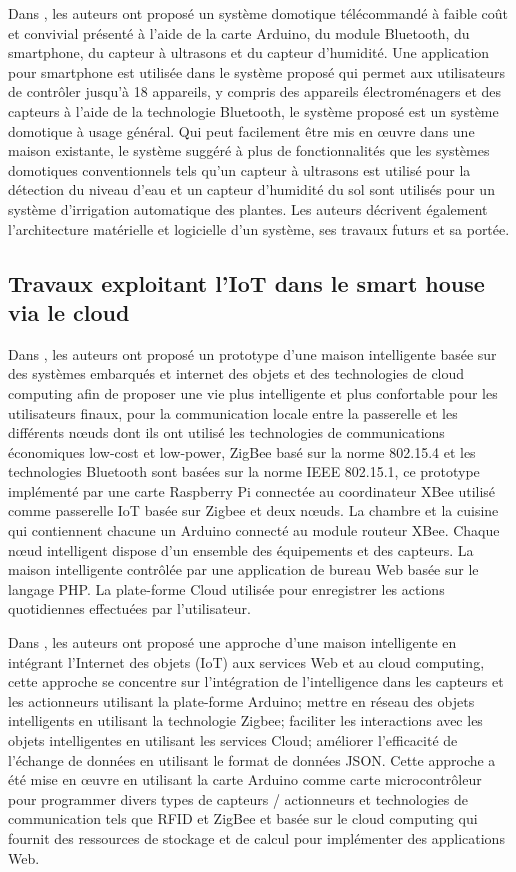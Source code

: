 Dans \cite{chap38}, les auteurs ont proposé un système domotique télécommandé à faible coût et convivial présenté à l'aide de la carte Arduino, du module Bluetooth, du smartphone, du capteur à ultrasons et du capteur d'humidité. Une application pour smartphone est utilisée dans le système proposé qui permet aux utilisateurs de contrôler jusqu'à 18 appareils, y compris des appareils électroménagers et des capteurs à l'aide de la technologie Bluetooth, le système proposé est un système domotique à usage général. Qui peut facilement être mis en œuvre dans une maison existante, le système suggéré à plus de fonctionnalités que les systèmes domotiques conventionnels tels qu'un capteur à ultrasons est utilisé pour la détection du niveau d'eau et un capteur d'humidité du sol sont utilisés pour un système d'irrigation automatique des plantes. Les auteurs décrivent également l'architecture matérielle et logicielle d'un système, ses travaux futurs et sa portée.


\subsection{Travaux exploitant l’IoT dans le smart house via le cloud }
Dans \cite{chap33}, les auteurs ont proposé un prototype d’une maison intelligente basée sur des systèmes embarqués et internet des objets et des technologies de cloud computing afin de proposer une vie plus intelligente et plus confortable pour les utilisateurs finaux, pour la communication locale entre la passerelle et les différents nœuds dont ils ont utilisé les technologies de communications économiques low-cost et low-power, ZigBee basé sur la norme 802.15.4 et les technologies Bluetooth sont basées sur la norme IEEE 802.15.1, ce prototype implémenté par une carte Raspberry Pi connectée au coordinateur XBee utilisé comme passerelle IoT basée sur Zigbee et deux nœuds. La chambre et la cuisine qui contiennent chacune un Arduino connecté au module routeur XBee. Chaque nœud intelligent dispose d'un ensemble des équipements et des capteurs. La maison intelligente contrôlée par une application de bureau Web basée sur le langage PHP. La plate-forme Cloud utilisée pour enregistrer les actions quotidiennes effectuées par l'utilisateur.


Dans \cite{chap34}, les auteurs ont proposé une approche d'une maison intelligente en intégrant l'Internet des objets (IoT) aux services Web et au cloud computing, cette approche se concentre sur l'intégration de l'intelligence dans les capteurs et les actionneurs utilisant la plate-forme Arduino; mettre en réseau des objets intelligents en utilisant la technologie Zigbee; faciliter les interactions avec les objets intelligentes en utilisant les services Cloud; améliorer l'efficacité de l'échange de données en utilisant le format de données JSON. Cette approche a été mise en œuvre en utilisant la carte Arduino comme carte microcontrôleur pour programmer divers types de capteurs / actionneurs et technologies de communication tels que RFID et ZigBee et basée sur le cloud computing qui fournit des ressources de stockage et de calcul pour implémenter des applications Web.


